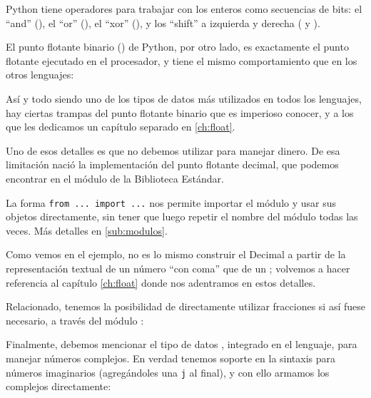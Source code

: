 Python tiene operadores para trabajar con los enteros como secuencias de bits: el ``and'' (\mip{&}), el ``or'' (\mip{|}), el ``xor'' (\mip{^}), y los ``shift'' a izquierda y derecha (\mip{<<} y \mip{>>}).


El punto flotante binario () de Python, por otro lado, es exactamente el punto flotante ejecutado en el procesador, y tiene el mismo comportamiento que en los otros lenguajes:


Así y todo siendo uno de los tipos de datos más utilizados en todos los lenguajes, hay ciertas trampas del punto flotante binario que es imperioso conocer, y a los que les dedicamos un capítulo separado en \ref{ch:float}.

Uno de esos detalles es que no debemos utilizar  para manejar dinero. De esa limitación nació la implementación del punto flotante decimal, que podemos encontrar en el módulo  de la Biblioteca Estándar.


\begin{info}
La forma \texttt{from ... import ...} nos permite importar el módulo y usar sus objetos directamente, sin tener que luego repetir el nombre del módulo todas las veces. Más detalles en \ref{sub:modulos}.
\end{info}

Como vemos en el ejemplo, no es lo mismo construir el Decimal a partir de la representación textual de un número ``con coma'' que de un ; volvemos a hacer referencia al capítulo \ref{ch:float} donde nos adentramos en estos detalles.

Relacionado, tenemos la posibilidad de directamente utilizar fracciones si así fuese necesario, a través del módulo :


Finalmente, debemos mencionar el tipo de datos , integrado en el lenguaje, para manejar números complejos. En verdad tenemos soporte en la sintaxis para números imaginarios (agregándoles una \texttt{j} al final), y con ello armamos los complejos directamente:


